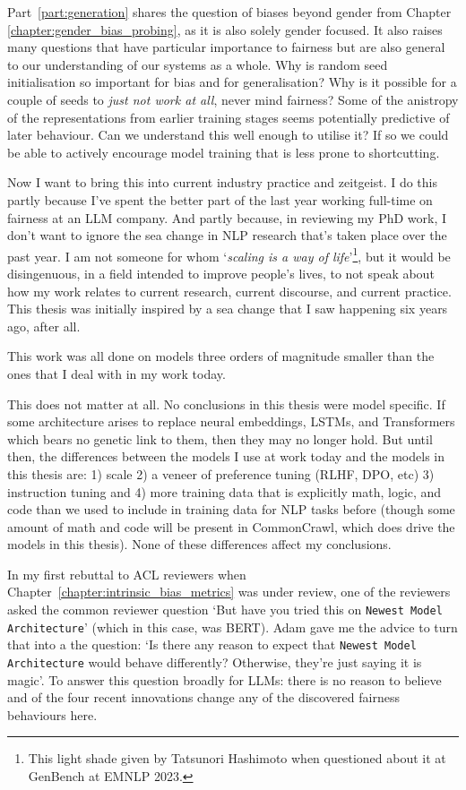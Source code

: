 Part~\ref{part:generation} shares the question of biases beyond gender from Chapter \ref{chapter:gender_bias_probing}, as it is also solely gender focused. It also raises many questions that have particular importance to fairness but are also general to our understanding of our systems as a whole. Why is random seed initialisation so important for bias and for generalisation? Why is it possible for a couple of seeds to \textit{just not work at all}, never mind fairness? Some of the anistropy of the representations from earlier training stages seems potentially predictive of later behaviour. Can we understand this well enough to utilise it? If so we could be able to actively encourage model training that is less prone to shortcutting. 

Now I want to bring this into current industry practice and zeitgeist. I do this partly because I've spent the better part of the last year working full-time on fairness at an LLM company. And partly because, in reviewing my PhD work, I don't want to ignore the sea change in NLP research that's taken place over the past year. I am not someone for whom `\textit{scaling is a way of life}'\footnote{This light shade given by Tatsunori Hashimoto when questioned about it at GenBench at EMNLP 2023.}, but it would be disingenuous, in a field intended to improve people's lives, to not speak about how my work relates to current research, current discourse, and current practice. This thesis was initially inspired by a sea change that I saw happening six years ago, after all. 

This work was all done on models three orders of magnitude smaller than the ones that I deal with in my work today. 

This does not matter at all. No conclusions in this thesis were model specific. If some architecture arises to replace neural embeddings, LSTMs, and Transformers which bears no genetic link to them, then they may no longer hold. But until then, the differences between the models I use at work today and the models in this thesis are: 1) scale 2) a veneer of preference tuning (RLHF, DPO, etc) \citep{rafailov2024direct} 3) instruction tuning \citep{ouyang2022training} and 4) more training data that is explicitly math, logic, and code than we used to include in training data for NLP tasks before (though some amount of math and code will be present in CommonCrawl, which does drive the models in this thesis). None of these differences affect my conclusions. 

In my first rebuttal to ACL reviewers when Chapter~\ref{chapter:intrinsic_bias_metrics} was under review, one of the reviewers asked the common reviewer question `But have you tried this on {\tt Newest Model Architecture}' (which in this case, was BERT). Adam gave me the advice to turn that into a the question: `Is there any reason to expect that {\tt Newest Model Architecture} would behave differently? Otherwise, they're just saying it is magic'. To answer this question broadly for LLMs: there is no reason to believe and of the four recent innovations change any of the discovered fairness behaviours here.

